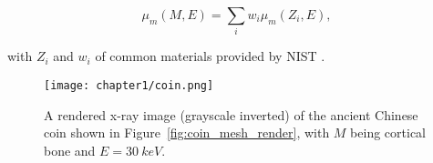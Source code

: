 \begin{equation}
  \mu_m(M, E) = \sum_i w_i \mu_m(Z_i, E),
\end{equation}

\noindent with {$Z_i$} and {$w_i$} of common materials provided by NIST \cite{hubbell1982photon}.

\begin{figure}
  \centering
  \texttt{[image: chapter1/coin.png]}
  \caption{A rendered x-ray image (grayscale inverted) of the ancient Chinese coin shown in Figure~\ref{fig:coin_mesh_render}, with $M$ being cortical bone and $E = \qty{30}{keV}$.}
\end{figure}





  






